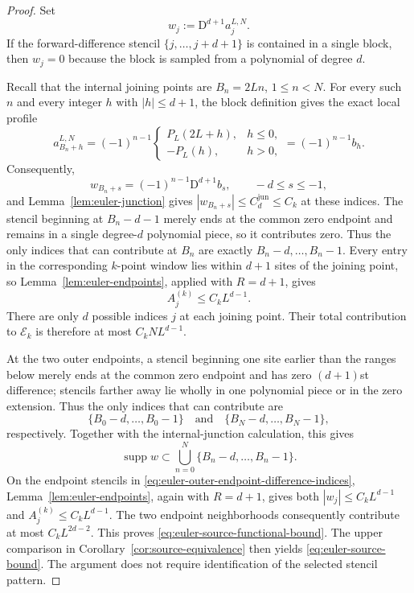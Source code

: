 \documentclass[11pt]{amsart}
\theoremstyle{plain}
\theoremstyle{definition}
\theoremstyle{remark}
\numberwithin{equation}{section}
\theoremstyle{plain}
\begin{document}
\begin{proof}
	Set
	\[
	w_j:=\mathrm D^{d+1}a_j^{L,N}.
	\]
	If the forward-difference stencil $\{j,\ldots,j+d+1\}$ is contained in a
	single block, then $w_j=0$ because the block is sampled from a polynomial of
	degree $d$.
	
	Recall that the internal joining points are $B_n=2Ln$,
	$1\le n<N$.  For every such $n$ and every integer $h$ with
	$|h|\le d+1$, the block definition gives the exact local profile
	\begin{equation}\label{eq:euler-internal-junction-profile}
		a_{B_n+h}^{L,N}
		=(-1)^{n-1}
		\begin{cases}
			P_L(2L+h),&h\le0,\\
			-P_L(h),&h>0,
		\end{cases}
		=(-1)^{n-1}b_h.
	\end{equation}
	Consequently,
	\begin{equation}\label{eq:euler-internal-junction-differences}
		w_{B_n+s}=(-1)^{n-1}\mathrm D^{d+1}b_s,
		\qquad -d\le s\le-1,
	\end{equation}
	and Lemma~\ref{lem:euler-junction} gives
	$|w_{B_n+s}|\le C_d^{\mathrm{jun}}\le C_k$ at these indices.  The
	stencil beginning at $B_n-d-1$ merely ends at the common zero endpoint
	and remains in a single degree-$d$ polynomial piece, so it contributes
	zero.  Thus the only indices that can contribute at $B_n$ are exactly
	$B_n-d,\ldots,B_n-1$.
	Every entry in the corresponding $k$-point window lies
	within $d+1$ sites of the joining point, so
	Lemma~\ref{lem:euler-endpoints}, applied with $R=d+1$, gives
	\[
	A_j^{(k)}\le C_kL^{d-1}.
	\]
	There are only $d$ possible indices $j$ at each joining point.
	Their total contribution to $\mathcal E_k$ is therefore at most
	$C_kNL^{d-1}$.
	
	At the two outer endpoints, a stencil beginning one site earlier
	than the ranges below merely ends at the common zero endpoint and has zero
	$(d+1)$st difference; stencils farther away lie wholly in one polynomial
	piece or in the zero extension.  Thus the only indices that can contribute are
	\begin{equation}\label{eq:euler-outer-endpoint-difference-indices}
		\{B_0-d,\ldots,B_0-1\}
		\quad\text{and}\quad
		\{B_N-d,\ldots,B_N-1\},
	\end{equation}
	respectively.  Together with the internal-junction calculation, this gives
	\begin{equation}\label{eq:euler-difference-global-support}
		\operatorname{supp}w
		\subset
		\bigcup_{n=0}^{N}\{B_n-d,\ldots,B_n-1\}.
	\end{equation}
	On the endpoint stencils in
	\eqref{eq:euler-outer-endpoint-difference-indices},
	Lemma~\ref{lem:euler-endpoints}, again with $R=d+1$, gives both
	$|w_j|\le C_kL^{d-1}$ and $A_j^{(k)}\le C_kL^{d-1}$.  The two
	endpoint neighborhoods consequently contribute at most
	$C_kL^{2d-2}$.  This proves
	\eqref{eq:euler-source-functional-bound}.  The upper comparison in
	Corollary~\ref{cor:source-equivalence} then yields
	\eqref{eq:euler-source-bound}.
	The argument does not require identification of the selected stencil
	pattern.
\end{proof}
\end{document}
